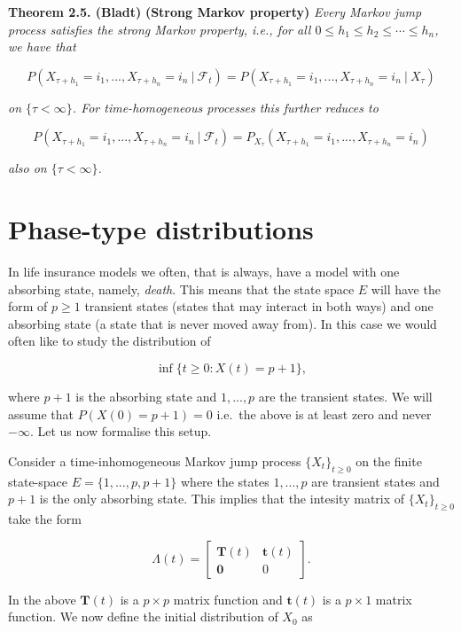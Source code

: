 \documentclass[a4paper,12pt,openany]{book}
\begin{document}
\textbf{Theorem 2.5. (Bladt)} \textbf{(Strong Markov property)} \emph{Every Markov jump process satisfies the strong Markov property, i.e., for all \(0\le h_1\le h_2\le \cdots \le h_n\), we have that}

\[
P(X_{\tau +h_1}=i_1,...,X_{\tau + h_n}=i_n\ \vert\ \mathcal{F}_t)=P(X_{\tau +h_1}=i_1,...,X_{\tau + h_n}=i_n\ \vert\ X_\tau)
\]

\emph{on \(\{\tau <\infty\}\). For time-homogeneous processes this further reduces to}

\[
P(X_{\tau +h_1}=i_1,...,X_{\tau + h_n}=i_n\ \vert\ \mathcal{F}_t)=P_{X_\tau}(X_{\tau +h_1}=i_1,...,X_{\tau + h_n}=i_n)
\]

\emph{also on \(\{\tau <\infty\}\).}

\hypertarget{phase-type-distributions}{%
\section{Phase-type distributions}\label{phase-type-distributions}}

In life insurance models we often, that is always, have a model with one absorbing state, namely, \emph{death}. This means that the state space \(E\) will have the form of \(p\ge 1\) transient states (states that may interact in both ways) and one absorbing state (a state that is never moved away from). In this case we would often like to study the distribution of

\[
\inf\{t\ge 0 : X(t)=p+1\},
\]

where \(p+1\) is the absorbing state and \(1,...,p\) are the transient states. We will assume that \(P(X(0)=p+1)=0\) i.e.~the above is at least zero and never \(-\infty\). Let us now formalise this setup.

Consider a time-inhomogeneous Markov jump process \(\{X_t\}_{t\ge 0}\) on the finite state-space \(E=\{1,...,p,p+1\}\) where the states \(1,...,p\) are transient states and \(p+1\) is the only absorbing state. This implies that the intesity matrix of \(\{X_t\}_{t\ge 0}\) take the form

\[
\Lambda(t)=\begin{bmatrix}
\mathbf{T}(t) & \mathbf{t}(t)\\
\mathbf{0} & 0
\end{bmatrix}.
\]

In the above \(\mathbf{T}(t)\) is a \(p\times p\) matrix function and \(\mathbf{t}(t)\) is a \(p\times 1\) matrix function. We now define the initial distribution of \(X_0\) as
\end{document}
